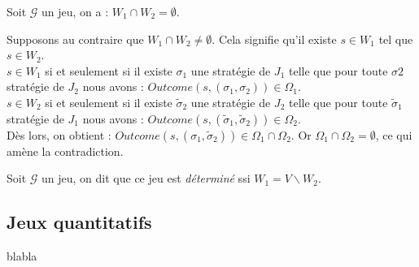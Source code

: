 	\begin{propriete}
		Soit $\mathcal{G}$ un jeu, on a : $W_{1}\cap W_{2} = \emptyset$.
	\end{propriete}
	\begin{demonstration}
		Supposons au contraire que $W_{1}\cap W_{2} \neq \emptyset$. Cela signifie qu'il existe $s \in W_{1}$ tel que $s \in W_{2}$.\\
		$s \in W_{1}$ si et seulement si il existe $\sigma _{1}$ une stratégie de $J_{1}$ telle que pour toute $\sigma {2}$ stratégie de $J_{2}$ nous avons : $Outcome(s,(\sigma _{1},\sigma _{2})) \in \Omega _{1}$.\\
		$s \in W_{2}$ si et seulement si il existe $\tilde{\sigma} _{2}$ une stratégie de $J_{2}$ telle que pour toute $\tilde{\sigma}_{1}$ stratégie de $J_{1}$ nous avons : $Outcome(s,(\tilde{\sigma}_{1},\tilde{\sigma}_{2})) \in \Omega _{2}$.\\
		Dès lors, on obtient : $Outcome(s,(\sigma _{1},\tilde{\sigma}_{2})) \in \Omega _{1} \cap \Omega _{2}$. Or $\Omega _{1} \cap \Omega _{2} = \emptyset$, ce qui amène la contradiction.\\
	\end{demonstration}
	
	\begin{defi}
		Soit $\mathcal{G}$ un jeu, on dit que ce jeu est \textit{déterminé} ssi $W_{1} = V \backslash W_{2}$.
	\end{defi}
		
		
\subsection{Jeux quantitatifs }
	blabla

